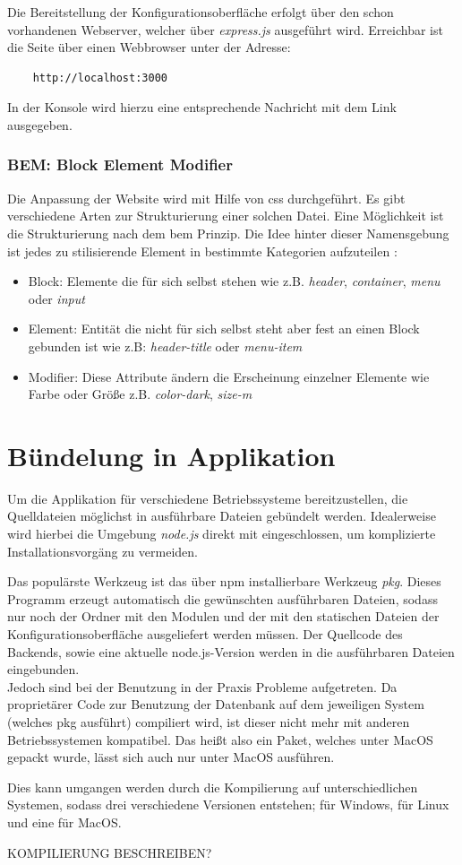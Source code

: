 Die Bereitstellung der Konfigurationsoberfläche erfolgt über den schon vorhandenen Webserver, welcher über \textit{express.js} ausgeführt wird. Erreichbar ist die Seite über einen Webbrowser unter der Adresse:

\begin{verbatim}
    http://localhost:3000
\end{verbatim}

In der Konsole wird hierzu eine entsprechende Nachricht mit dem Link ausgegeben.

\subsubsection{BEM: Block Element Modifier}
Die Anpassung der Website wird mit Hilfe von \gls{css} durchgeführt. Es gibt verschiedene Arten zur Strukturierung einer solchen Datei. Eine Möglichkeit ist die Strukturierung nach dem \gls{bem} Prinzip. Die Idee hinter dieser Namensgebung ist jedes zu stilisierende Element in bestimmte Kategorien aufzuteilen \cite{VsevolodStrukchinsky.2020, Finelli.October2017}:

\begin{itemize}
    \item Block: Elemente die für sich selbst stehen wie z.B.  \textit{header}, \textit{container}, \textit{menu} oder \textit{input}
    \item Element: Entität die nicht für sich selbst steht aber fest an einen Block gebunden ist wie z.B: \textit{header-title} oder \textit{menu-item}
    \item Modifier: Diese Attribute ändern die Erscheinung einzelner Elemente wie Farbe oder Größe z.B. \textit{color-dark}, \textit{size-m}
\end{itemize}

\section{Bündelung in Applikation} \label{sec:bundle}

Um die Applikation für verschiedene Betriebssysteme bereitzustellen, die Quelldateien möglichst in ausführbare Dateien gebündelt werden.
Idealerweise wird hierbei die Umgebung \textit{node.js} 
direkt mit eingeschlossen, um komplizierte Installationsvorgäng zu vermeiden.

Das populärste Werkzeug ist das über \gls{npm} installierbare Werkzeug \textit{pkg}. Dieses Programm erzeugt automatisch die gewünschten ausführbaren Dateien, sodass nur noch der Ordner mit den Modulen und der mit den statischen Dateien der Konfigurationsoberfläche ausgeliefert werden müssen. Der Quellcode des Backends, sowie eine aktuelle  node.js-Version werden in die ausführbaren Dateien eingebunden. \cite{igorklopov.2020}
\\
Jedoch sind bei der Benutzung in der Praxis Probleme aufgetreten. Da proprietärer Code zur Benutzung der Datenbank auf dem jeweiligen System (welches pkg ausführt) compiliert wird, ist dieser nicht mehr mit anderen Betriebssystemen kompatibel. Das heißt also ein Paket, welches unter MacOS gepackt wurde, lässt sich auch nur unter MacOS ausführen. 

Dies kann umgangen werden durch die Kompilierung auf unterschiedlichen Systemen, sodass drei verschiedene Versionen entstehen; für Windows, für Linux und eine für MacOS.


 KOMPILIERUNG BESCHREIBEN? 


